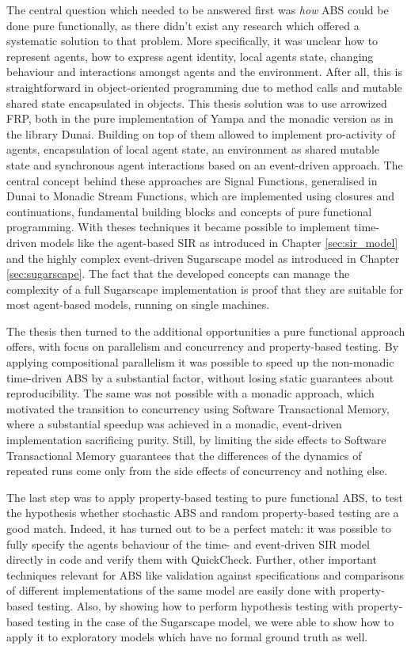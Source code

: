 The central question which needed to be answered first was \textit{how} ABS could be done pure functionally, as there didn't exist any research which offered a systematic solution to that problem. More specifically, it was unclear how to represent agents, how to express agent identity, local agents state, changing behaviour and interactions amongst agents and the environment. After all, this is straightforward in object-oriented programming due to method calls and mutable shared state encapsulated in objects. This thesis solution was to use arrowized FRP, both in the pure implementation of Yampa and the monadic version as in the library Dunai. Building on top of them allowed to implement pro-activity of agents, encapsulation of local agent state, an environment as shared mutable state and synchronous agent interactions based on an event-driven approach. The central concept behind these approaches are Signal Functions, generalised in Dunai to Monadic Stream Functions, which are implemented using closures and continuations, fundamental building blocks and concepts of pure functional programming. With theses techniques it became possible to implement time-driven models like the agent-based SIR as introduced in Chapter \ref{sec:sir_model} and the highly complex event-driven Sugarscape model as introduced in Chapter \ref{sec:sugarscape}. The fact that the developed concepts can manage the complexity of a full Sugarscape implementation is proof that they are suitable for most agent-based models, running on single machines.

The thesis then turned to the additional opportunities a pure functional approach offers, with focus on parallelism and concurrency and property-based testing. By applying compositional parallelism it was possible to speed up the non-monadic time-driven ABS by a substantial factor, without losing static guarantees about reproducibility. The same was not possible with a monadic approach, which motivated the transition to concurrency using Software Transactional Memory, where a substantial speedup was achieved in a monadic, event-driven implementation sacrificing purity. Still, by limiting the side effects to Software Transactional Memory guarantees that the differences of the dynamics of repeated runs come only from the side effects of concurrency and nothing else.

The last step was to apply property-based testing to pure functional ABS, to test the hypothesis whether stochastic ABS and random property-based testing are a good match. Indeed, it has turned out to be a perfect match: it was possible to fully specify the agents behaviour of the time- and event-driven SIR model directly in code and verify them with QuickCheck. Further, other important techniques relevant for ABS like validation against specifications and comparisons of different implementations of the same model are easily done with property-based testing. Also, by showing how to perform hypothesis testing with property-based testing in the case of the Sugarscape model, we were able to show how to apply it to exploratory models which have no formal ground truth as well.


